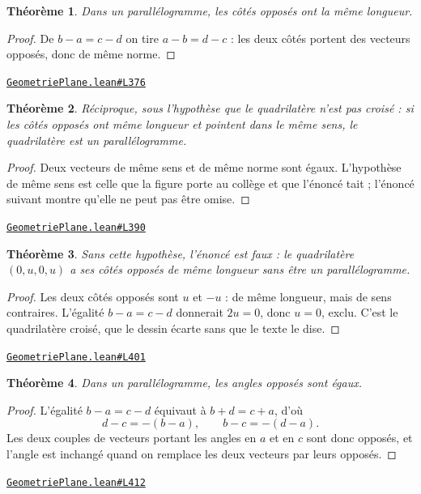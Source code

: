 \documentclass[11pt,a4paper]{article}
\theoremstyle{definition}
\theoremstyle{plain}
\newtheorem{theoreme}{Théorème}
\newcommand{\source}[2]{\par\smallskip\noindent\hfill{\footnotesize\href{#1}{\texttt{#2}}}\par\smallskip}
\begin{document}
\begin{theoreme}
Dans un parallélogramme, les côtés opposés ont la même longueur.
\end{theoreme}

\begin{proof}
De $b - a = c - d$ on tire $a - b = d - c$ : les deux côtés portent des vecteurs opposés,
donc de même norme.
\end{proof}
\source{https://github.com/Commutator-IO/learn-lean/blob/main/cours/01-college/02-geometrie-plane/GeometriePlane.lean\#L376}{GeometriePlane.lean\#L376}

\begin{theoreme}
Réciproque, sous l'hypothèse que le quadrilatère n'est pas croisé : si les côtés
opposés ont même longueur et pointent dans le même sens, le quadrilatère est un
parallélogramme.
\end{theoreme}

\begin{proof}
Deux vecteurs de même sens et de même norme sont égaux. L'hypothèse de même sens est
celle que la figure porte au collège et que l'énoncé tait ; l'énoncé suivant montre qu'elle
ne peut pas être omise.
\end{proof}
\source{https://github.com/Commutator-IO/learn-lean/blob/main/cours/01-college/02-geometrie-plane/GeometriePlane.lean\#L390}{GeometriePlane.lean\#L390}

\begin{theoreme}
Sans cette hypothèse, l'énoncé est faux : le quadrilatère $(0, u, 0, u)$ a ses côtés
opposés de même longueur sans être un parallélogramme.
\end{theoreme}

\begin{proof}
Les deux côtés opposés sont $u$ et $-u$ : de même longueur, mais de sens contraires.
L'égalité $b - a = c - d$ donnerait $2u = 0$, donc $u = 0$, exclu. C'est le quadrilatère
croisé, que le dessin écarte sans que le texte le dise.
\end{proof}
\source{https://github.com/Commutator-IO/learn-lean/blob/main/cours/01-college/02-geometrie-plane/GeometriePlane.lean\#L401}{GeometriePlane.lean\#L401}

\begin{theoreme}
Dans un parallélogramme, les angles opposés sont égaux.
\end{theoreme}

\begin{proof}
L'égalité $b - a = c - d$ équivaut à $b + d = c + a$, d'où
\[ d - c = -(b - a), \qquad b - c = -(d - a) . \]
Les deux couples de vecteurs portant les angles en $a$ et en $c$ sont donc opposés, et
l'angle est inchangé quand on remplace les deux vecteurs par leurs opposés.
\end{proof}
\source{https://github.com/Commutator-IO/learn-lean/blob/main/cours/01-college/02-geometrie-plane/GeometriePlane.lean\#L412}{GeometriePlane.lean\#L412}
\end{document}
